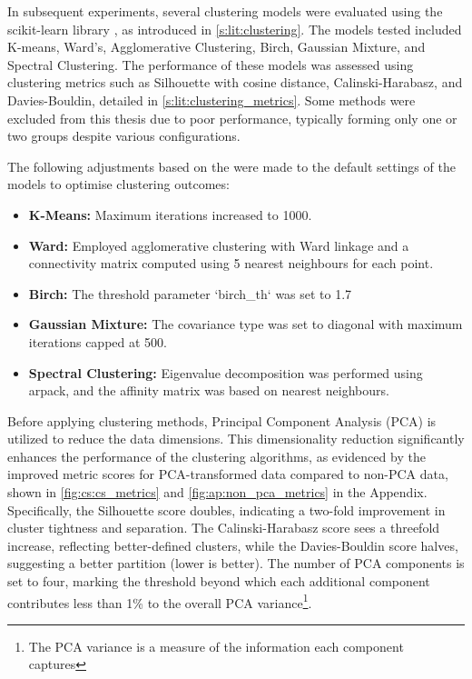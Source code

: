 In subsequent experiments, several clustering models were evaluated using the scikit-learn library \cite{Scikit-learn_undated-ax}, as introduced in \cref{s:lit:clustering}. The models tested included K-means, Ward’s, Agglomerative Clustering, Birch, Gaussian Mixture, and Spectral Clustering. The performance of these models was assessed using clustering metrics such as Silhouette with cosine distance, Calinski-Harabasz, and Davies-Bouldin, detailed in \cref{s:lit:clustering_metrics}. Some methods were excluded from this thesis due to poor performance, typically forming only one or two groups despite various configurations.

The following adjustments based on the \citet{Scikit-learn_undated-ax} were made to the default settings of the models to optimise clustering outcomes:
\begin{itemize}
    \item \textbf{K-Means:} Maximum iterations increased to 1000.
    \item \textbf{Ward:} Employed agglomerative clustering with Ward linkage and a connectivity matrix computed using 5 nearest neighbours for each point.
    \item \textbf{Birch:} The threshold parameter `birch\_th` was set to 1.7
    \item \textbf{Gaussian Mixture:} The covariance type was set to diagonal with maximum iterations capped at 500.
    \item \textbf{Spectral Clustering:} Eigenvalue decomposition was performed using arpack, and the affinity matrix was based on nearest neighbours.
\end{itemize}


Before applying clustering methods, Principal Component Analysis (PCA) is utilized to reduce the data dimensions. This dimensionality reduction significantly enhances the performance of the clustering algorithms, as evidenced by the improved metric scores for PCA-transformed data compared to non-PCA data, shown in \cref{fig:cs:cs_metrics} and \cref{fig:ap:non_pca_metrics} in the Appendix. Specifically, the Silhouette score doubles, indicating a two-fold improvement in cluster tightness and separation. The Calinski-Harabasz score sees a threefold increase, reflecting better-defined clusters, while the Davies-Bouldin score halves, suggesting a better partition (lower is better). The number of PCA components is set to four, marking the threshold beyond which each additional component contributes less than 1\% to the overall PCA variance\footnote{The PCA variance is a measure of the information each component captures}.


